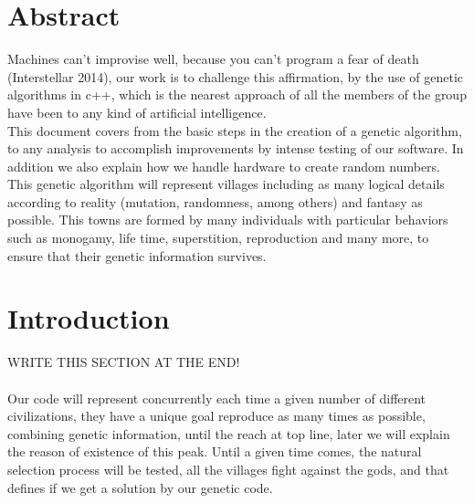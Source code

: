 \documentclass[twocolumn]{IEEEtran}
\begin{document}
\makeatletter
\def\markboth#1#2{\def\leftmark{\@IEEEcompsoconly{\sffamily}\MakeUppercase{\protect#1}}%
\def\rightmark{\@IEEEcompsoconly{\sffamily}\MakeUppercase{\protect#2}}}
\makeatother
\markboth{Abraham Arias, Fabian Solano,Lenin Torres, Mauricio Montero}{}
\maketitle

\section{Abstract}

Machines can't improvise well, because you can't program a fear of death (Interstellar 2014), our work is to challenge this affirmation, by the use of genetic algorithms in c++, which is the nearest approach of all the members of the group have been to any kind of artificial intelligence.\\ 
This document covers from the basic steps in the creation of a genetic algorithm, to any analysis to accomplish improvements by intense testing of our software. In addition we also explain how we handle hardware to create random numbers.\\
This genetic algorithm will represent villages including as many logical details according to reality (mutation, randomness, among others) and fantasy as possible. This towns are formed by many individuals with particular behaviors such as monogamy, life time, superstition, reproduction and many more, to ensure that their genetic information survives.



\section{Introduction}
WRITE THIS SECTION AT THE END!\\ \\
Our code will represent concurrently each time a given number of different civilizations, they have a unique goal reproduce as many times as possible, combining genetic information, until the reach at top line, later we will explain the reason of existence of this peak. Until a given time comes, the natural selection process will be tested, all the villages fight against the gods, and that defines if we get a solution by our genetic code.
\end{document}
